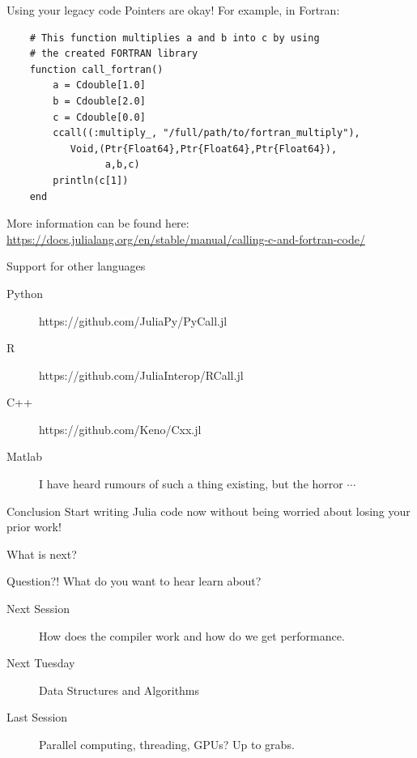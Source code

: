 \documentclass{beamer}
\begin{document}
\begin{frame}[fragile]{Using your legacy code}
Pointers are okay! For example, in Fortran:

\begin{lstlisting}
    # This function multiplies a and b into c by using 
    # the created FORTRAN library
    function call_fortran()
        a = Cdouble[1.0]
        b = Cdouble[2.0]
        c = Cdouble[0.0]
        ccall((:multiply_, "/full/path/to/fortran_multiply"),
           Void,(Ptr{Float64},Ptr{Float64},Ptr{Float64}),
                 a,b,c)
        println(c[1])
    end
\end{lstlisting}

\pause
More information can be found here: \url{https://docs.julialang.org/en/stable/manual/calling-c-and-fortran-code/}
\end{frame}
\begin{frame}{Support for other languages}
  \begin{description}
    \item[Python] https://github.com/JuliaPy/PyCall.jl
    \item[R] https://github.com/JuliaInterop/RCall.jl
    \item[C++] https://github.com/Keno/Cxx.jl
    \item[Matlab] I have heard rumours of such a thing existing, but the horror $\cdots$
  \end{description}
  \begin{block}{Conclusion}
    Start writing Julia code now without being worried about losing your prior work!
  \end{block}
\end{frame}
\begin{frame}{What is next?}
  \begin{block}{Question?!}
    What do you want to hear learn about?
  \end{block}
  \begin{description}
    \item[Next Session] How does the compiler work and how do we get performance.
    \item[Next Tuesday] Data Structures and Algorithms
    \item[Last Session] Parallel computing, threading, GPUs? Up to grabs.
  \end{description}
\end{frame}
\end{document}
